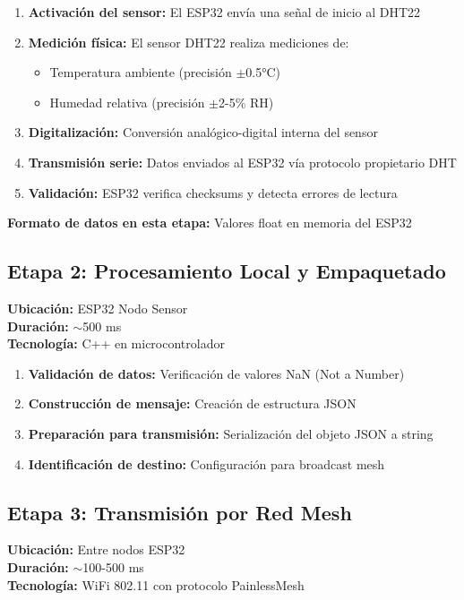 \documentclass[12pt]{article}
\begin{document}
\begin{enumerate}
    \item \textbf{Activación del sensor:} El ESP32 envía una señal de inicio al DHT22
    \item \textbf{Medición física:} El sensor DHT22 realiza mediciones de:
    \begin{itemize}
        \item Temperatura ambiente (precisión $\pm$0.5°C)
        \item Humedad relativa (precisión $\pm$2-5\% RH)
    \end{itemize}
    \item \textbf{Digitalización:} Conversión analógico-digital interna del sensor
    \item \textbf{Transmisión serie:} Datos enviados al ESP32 vía protocolo propietario DHT
    \item \textbf{Validación:} ESP32 verifica checksums y detecta errores de lectura
\end{enumerate}

\textbf{Formato de datos en esta etapa:} Valores float en memoria del ESP32

\subsection{Etapa 2: Procesamiento Local y Empaquetado}
\textbf{Ubicación:} ESP32 Nodo Sensor\\
\textbf{Duración:} $\sim$500 ms\\
\textbf{Tecnología:} C++ en microcontrolador

\begin{enumerate}
    \item \textbf{Validación de datos:} Verificación de valores NaN (Not a Number)
    \item \textbf{Construcción de mensaje:} Creación de estructura JSON
    \item \textbf{Preparación para transmisión:} Serialización del objeto JSON a string
    \item \textbf{Identificación de destino:} Configuración para broadcast mesh
\end{enumerate}

\subsection{Etapa 3: Transmisión por Red Mesh}
\textbf{Ubicación:} Entre nodos ESP32\\
\textbf{Duración:} $\sim$100-500 ms\\
\textbf{Tecnología:} WiFi 802.11 con protocolo PainlessMesh
\end{document}
